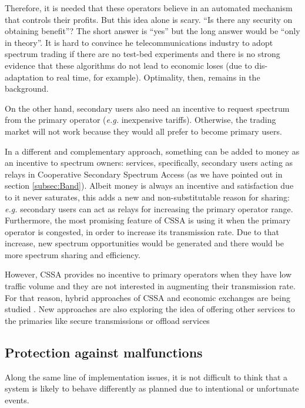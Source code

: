 Therefore, it is needed that these operators believe in an automated mechanism that controls their profits. 
But this idea alone is scary. ``Is there any security on obtaining benefit''? The short answer is ``yes'' but the long answer would be ``only in theory''. 
It is hard to convince he telecommunications industry to adopt spectrum trading if there are no test-bed experiments and there is no strong evidence that these algorithms do not lead to economic loses (due to dis-adaptation to real time, for example). Optimality, then, remains in the background. 

On the other hand, secondary users also need an incentive to request spectrum from the primary operator (\textit{e.g.} inexpensive tariffs). Otherwise, the trading market will not work because they would all prefer to become primary users. 

In a different and complementary approach, something can be added to money as an incentive to spectrum owners: services, specifically, secondary users acting as relays in Cooperative Secondary Spectrum Access (as we have pointed out in section \ref{subsec:Band}). 
Albeit money is always an incentive and satisfaction due to it never saturates, this adds a new and non-substitutable reason for sharing: \textit{e.g.} secondary users can act as relays for increasing the primary operator range. 
Furthermore, the most promising feature of CSSA is using it when the primary operator is congested, in order to increase its transmission rate. 
Due to that increase, new spectrum opportunities would be generated and there would be more spectrum sharing and efficiency. 

However, CSSA provides no incentive to primary operators when they have low traffic volume and they are not interested in augmenting their transmission rate.
For that reason, hybrid approaches of CSSA and economic exchanges are being studied \cite{ref:Zhang2012,ref:Zhang2009}. 
New approaches are also exploring the idea of offering other services to the primaries like secure transmissions \cite{ref:Lee2011} or offload services \cite{ref:Pantisano,ref:Yi}

\subsection{Protection against malfunctions}
Along the same line of implementation issues, it is not difficult to think that a system is likely to behave differently as planned due to intentional or unfortunate events.
